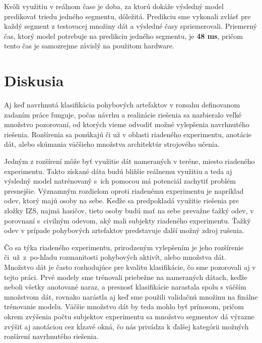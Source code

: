 Kvôli využitiu v reálnom čase je doba, za ktorú dokáže výsledný model predikovať triedu jedného segmentu, dôležitá. Predikciu sme vykonali zvlásť pre každý segment z testovacej množiny dát a výsledné časy spriemerovali. Priemerný čas, ktorý model potrebuje na predikciu jedného segmentu, je \textbf{48 ms}, pričom tento čas je samozrejme závislý na použitom hardware. 


\chapter{Diskusia}

Aj keď navrhnutá klasifikácia pohybových artefaktov v rozsahu definovanom zadaním práce funguje, počas návrhu a realizácie riešenia sa nazbieralo veľké množstvo pozorovaní, od ktorých vieme odvodiť možné vylepšenia navrhnutého riešenia. Rozšírenia sa ponúkajú či už v oblasti riadeného experimentu, anotácie dát, alebo skúmania väčšieho množstva architektúr strojového učenia. 

Jedným z rozšírení môže byť využitie dát nameraných v teréne, miesto riadeného experimentu. Takto získané dáta budú bližšie reálnemu využitiu a teda aj výsledný model natrénovaný s~ich pomocou má potenciál zachytiť problém presnejšie. Významným rozdielom oproti riadenému experimentu je napríklad odev, ktorý majú osoby na sebe. Keďže sa predpokladá využitie riešenia pre zložky IZS, najmä hasičov, tieto osoby budú mať na sebe prevažne ťažký odev, v porovnaní s~civilným odevom, aký mali subjekty riadeného experimentu. Ťažký odev v prípade pohybových artefaktov predstavuje ďalší možný zdroj rušenia.

Čo sa týka riadeného experimentu, prirodzeným vylepšením je jeho rozšírenie či~už~z~po-hľadu rozmanitosti pohybových aktivít, alebo množstva dát. Množstvo dát je často rozhodujúce pre kvalitu klasifikácie, čo sme pozorovali aj v tejto práci. Prvé modely sme trénovali priebežne na nameraných dátach, keďže neboli všetky anotované naraz, a presnosť klasifikácie narastala spolu s väčším množstvom dát, rovnako narástla aj keď sme použili validačnú množinu na finálne trénovanie modelu. Väčšie množstvo dát by teda mohlo byť prínosom, pričom okrem zvýšenia počtu subjektov experimentu sa množstvo segmentov dá výrazne zvýšiť aj anotáciou cez kĺzavé okná, čo nás privádza k ďalšej kategórii možných rozšírení navrhnutého riešenia. 

